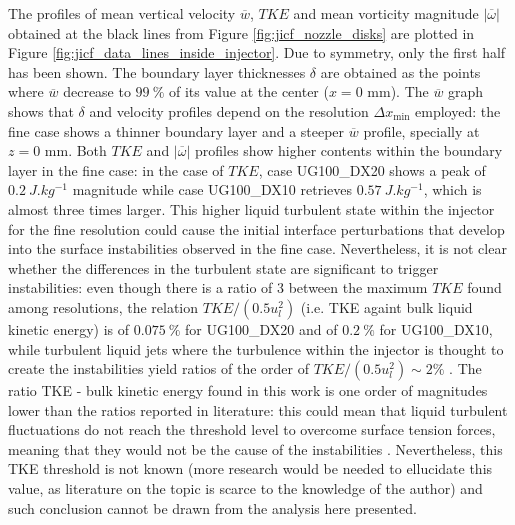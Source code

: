 The profiles of mean vertical velocity $\overline{w}$, $TKE$ and mean vorticity magnitude $|\overline{\omega}|$ obtained at the black lines from Figure \ref{fig:jicf_nozzle_disks} are plotted in Figure \ref{fig:jicf_data_lines_inside_injector}. Due to symmetry, only the first half has been shown. The boundary layer thicknesses $\delta$ are obtained as the points where $\overline{w}$ decrease to $99~\%$ of its value at the center ($x = 0$ mm). The $\overline{w}$ graph shows that $\delta$ and velocity profiles depend on the resolution $\Delta x_\mathrm{min}$ employed: the fine case shows a thinner boundary layer and a steeper $\overline{w}$ profile, specially at $z = 0$ mm. Both $TKE$ and $|\overline{\omega}|$ profiles show higher contents within the boundary layer in the fine case: in the case of $TKE$, case UG100\_DX20 shows a peak of $0.2~J.kg^{-1}$ magnitude while case UG100\_DX10 retrieves $0.57~J.kg^{-1}$, which is almost three times larger. This higher liquid turbulent state within the injector for the fine resolution could cause the initial interface perturbations that develop into the surface instabilities observed in the fine case. Nevertheless, it is not clear whether the differences in the turbulent state are significant to trigger instabilities: even though there is a ratio of 3 between the maximum $TKE$ found among resolutions, the relation $TKE/ \left( 0.5 u_l^2 \right)$ (i.e. TKE againt bulk liquid kinetic energy) is of $0.075~\%$ for UG100\_DX20 and of $0.2~\%$ for UG100\_DX10, while turbulent liquid jets where the turbulence within the injector is thought to create the instabilities  yield ratios of the order of $TKE/ \left( 0.5 u_l^2 \right) \sim 2 \%$ . The ratio TKE - bulk kinetic energy found in this work is one order of magnitudes lower than the ratios reported in literature: this could mean that liquid turbulent fluctuations do not reach the threshold level to overcome surface tension forces, meaning that they would not be the cause of the instabilities . Nevertheless, this TKE threshold is not known (more research would be needed to ellucidate this value, as literature on the topic is scarce to the knowledge of the author) and such conclusion cannot be drawn from the analysis here presented.


